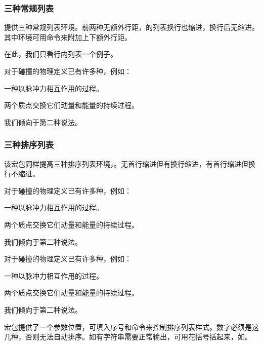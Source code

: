 \subsubsection{三种常规列表}
提供三种常规列表环境。前两种无额外行距，的列表换行也缩进，换行后无缩进。其中环境可用命令\latexline{\pltopsep=12pt}来附加上下额外行距。

在此，我们只看行内列表一个例子。

\begin{codeshow}
	对于碰撞的物理定义已有许多种，例如：
	\begin{inparaitem}[\S]
		\item 一种以脉冲力相互作用的过程。
		\item 两个质点交换它们动量和能量的持续过程。
	\end{inparaitem}
	我们倾向于第二种说法。
\end{codeshow}

\subsubsection{三种排序列表}
该宏包同样提高三种排序列表环境，。无首行缩进但有换行缩进，有首行缩进但换行不缩进。

\begin{codeshow}
	对于碰撞的物理定义已有许多种，例如：
	\begin{compactenum}[(1)]
		\item 一种以脉冲力相互作用的过程。
		\item 两个质点交换它们动量和能量的持续过程。
	\end{compactenum}
	我们倾向于第二种说法。
\end{codeshow}

\begin{codeshow}
	对于碰撞的物理定义已有许多种，例如：
	\begin{asparaenum}[(1)]
		\item 一种以脉冲力相互作用的过程。
		\item 两个质点交换它们动量和能量的持续过程。
	\end{asparaenum}
	我们倾向于第二种说法。
\end{codeshow}

宏包提供了一个参数位置，可填入序号和命令来控制排序列表样式。数字必须是这几种，否则无法自动排序。如有字符串需要正常输出，可用花括号括起来，如\latexline{[{例} 1]}。


